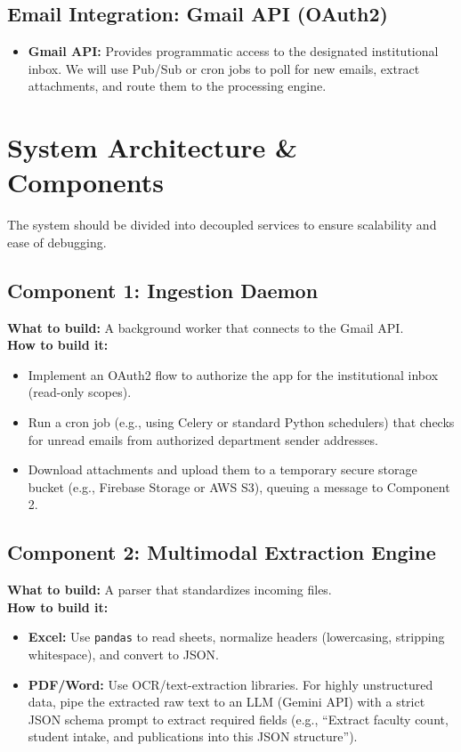 \documentclass[11pt,a4paper]{article}
\begin{document}
\subsection{Email Integration: Gmail API (OAuth2)}
\begin{itemize}[leftmargin=*]
    \item \textbf{Gmail API:} Provides programmatic access to the designated institutional inbox. We will use Pub/Sub or cron jobs to poll for new emails, extract attachments, and route them to the processing engine.
\end{itemize}

\section{System Architecture \& Components}
The system should be divided into decoupled services to ensure scalability and ease of debugging.

\subsection{Component 1: Ingestion Daemon}
\textbf{What to build:} A background worker that connects to the Gmail API. \\
\textbf{How to build it:}
\begin{itemize}
    \item Implement an OAuth2 flow to authorize the app for the institutional inbox (read-only scopes).
    \item Run a cron job (e.g., using Celery or standard Python schedulers) that checks for unread emails from authorized department sender addresses.
    \item Download attachments and upload them to a temporary secure storage bucket (e.g., Firebase Storage or AWS S3), queuing a message to Component 2.
\end{itemize}

\subsection{Component 2: Multimodal Extraction Engine}
\textbf{What to build:} A parser that standardizes incoming files. \\
\textbf{How to build it:}
\begin{itemize}
    \item \textbf{Excel:} Use \texttt{pandas} to read sheets, normalize headers (lowercasing, stripping whitespace), and convert to JSON.
    \item \textbf{PDF/Word:} Use OCR/text-extraction libraries. For highly unstructured data, pipe the extracted raw text to an LLM (Gemini API) with a strict JSON schema prompt to extract required fields (e.g., ``Extract faculty count, student intake, and publications into this JSON structure'').
\end{itemize}
\end{document}
